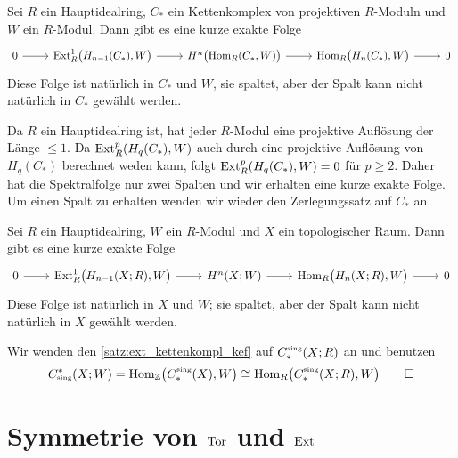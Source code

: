 \begin{satz}[label=satz:ext_kettenkompl_kef]
	Sei $R$ ein Hauptidealring, $C_*$ ein Kettenkomplex von projektiven $R$-Moduln und $W$ ein $R$-Modul.
	Dann gibt es eine kurze exakte Folge
	\[
		\begin{tikzcd}
			0 \rar & \Ext_R^1 \enbrace[\big]{H_{n-1}(C_*),W} \rar & H^n \enbrace[\big]{\Hom_R(C_*,W)} \rar & \Hom_R \enbrace[\big]{H_n(C_*),W} \rar & 0
		\end{tikzcd}
	\]
	Diese Folge ist natürlich in $C_*$ und $W$, sie spaltet, aber der Spalt kann nicht natürlich in $C_*$ gewählt werden.
\end{satz}
\begin{beweis}
	Da $R$ ein Hauptidealring ist, hat jeder $R$-Modul eine projektive Auflösung der Länge $\le 1$.
	Da $\Ext_R^p \enbrace*{H_q(C_*),W}$ auch durch eine projektive Auflösung von $H_q(C_*)$ berechnet weden kann, folgt $\Ext_R^p \enbrace*{H_q(C_*),W}=0$ für $p \ge 2$.
	Daher hat die Spektralfolge nur zwei Spalten und wir erhalten eine kurze exakte Folge.
	Um einen Spalt zu erhalten wenden wir wieder den Zerlegungssatz auf $C_*$ an.
\end{beweis}

\begin{satz}[label=univ_koeff_space]
	Sei $R$ ein Hauptidealring, $W$ ein $R$-Modul und $X$ ein topologischer Raum.
	Dann gibt es eine kurze exakte Folge
	\[
		\begin{tikzcd}[sep=2.2em]
			0 \rar & \Ext_R^1 \enbrace[\big]{H_{n-1}(X;R),W} \rar & H^n(X;W) \rar & \Hom_R \enbrace[\big]{H_n(X;R),W} \rar & 0
		\end{tikzcd}
	\]
	Diese Folge ist natürlich in $X$ und $W$; sie spaltet, aber der Spalt kann nicht natürlich in $X$ gewählt werden.
\end{satz}
\begin{beweis}
	Wir wenden den \autoref{satz:ext_kettenkompl_kef} auf $C_*^\sing(X;R)$ an und benutzen
	\[
		C_\sing^*(X;W) = \Hom_\mathbb{Z} \enbrace*{C_*^\sing(X),W} \cong \Hom_R \enbrace*{C_*^\sing(X;R),W} \qedhere
	\]
\end{beweis}
\newpage

\section{Symmetrie von $\operatorname{Tor}$ und $\operatorname{Ext}$} %
\label{sec:18}

